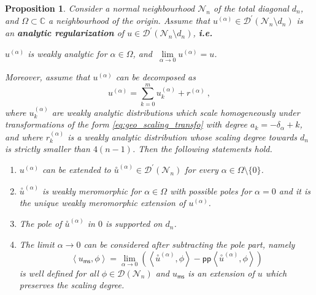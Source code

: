 \documentclass[11pt]{book}
\newcommand{\pp}{\mathsf{pp}}
\newcommand{\ms}{\mathsf{ms}}
\newcommand{\sm}[1]{\left\langle#1\right\rangle}
\newcommand{\exte}[1]{\overset{\circ}{#1}}
\newcommand{\Dcal}{\mathcal{D}}
\newcommand{\Ncal}{\mathcal{N}}
\newcommand{\Cbb}{\mathbb{C}}
\theoremstyle{break}
\newtheorem{proposition}{Proposition}
\begin{document}
\begin{proposition}\label{prop:regularization}
Consider a normal neighbourhood $\Ncal_n$ of the total diagonal $d_n$, and $\Omega \subset \Cbb$ a neighbourhood of the origin. Assume that $u^{(\alpha)}\in\Dcal^\prime(\Ncal_n\setminus d_n)$ is an \textbf{analytic regularization} of $u\in\Dcal^\prime(\Ncal_n\setminus d_n)$, \textbf{i.e.}
%
\begin{center}
$u^{(\alpha)}$ is weakly analytic for $\alpha \in \Omega$, and $\ \underset{\alpha\to 0}{\lim} u^{(\alpha)} = u$.
\end{center}
%
Moreover, assume that $u^{(\alpha)}$ can be decomposed as 
%
\begin{equation*}
u^{(\alpha)} = \sum_{k=0}^m u^{(\alpha)}_k + r^{(\alpha)} \ ,
\end{equation*}
%
where $u^{(\alpha)}_k$ are weakly analytic distributions which scale homogeneously under transformations of the form \eqref{eq:geo_scaling_transfo} with degree $a_k = -\delta_\alpha + k$, and where $r^{(\alpha)}_k$ is a weakly analytic distribution whose scaling degree towards $d_n$ is strictly smaller than $4(n-1)$. Then the following statements hold.
%
\begin{enumerate}
\item $u^{(\alpha)}$ can be extended to $\exte{u}^{(\alpha)} \in \Dcal^\prime(\Ncal_n)$ for every $\alpha \in \Omega \setminus \{0\}$.
%
\item $\exte{u}^{(\alpha)}$ is weakly meromorphic for $\alpha \in \Omega$ with possible poles for $\alpha=0$ and it is the unique weakly meromorphic extension of $u^{(\alpha)}$.
%
\item The pole of $\exte{u}^{(\alpha)}$ in $0$ is supported on $d_n$.
%
\item The limit $\alpha \to 0$ can be considered after subtracting the pole part, namely
%
\begin{equation*}
\sm{ u_\ms, \phi } = \lim_{\alpha \to 0} \left( \sm{ \exte{u}^{(\alpha)} , \phi } - \pp\sm{ \exte{u}^{(\alpha)} , \phi } \right) 
\end{equation*}
%
is well defined for all $\phi \in \Dcal(\Ncal_n)$ and $u_\ms$ is an extension of $u$ which preserves the scaling degree.
\end{enumerate}
%
\end{proposition}
\end{document}
